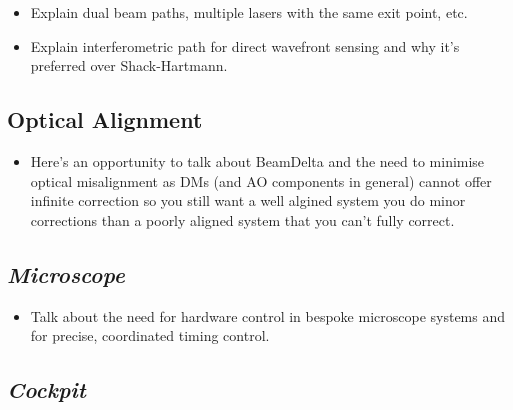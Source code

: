 	\begin{itemize}
		\item Explain dual beam paths, multiple lasers with the same exit point, etc.
		\item Explain interferometric path for direct wavefront sensing and why it's preferred over Shack-Hartmann.
	\end{itemize}

	\subsection{Optical Alignment}
	\label{subsec:alignment}
	
	\begin{itemize}
		\item Here's an opportunity to talk about BeamDelta and the need to minimise optical misalignment as DMs (and  AO components in general) cannot offer infinite correction so you still want a well algined system you do minor corrections than a poorly aligned system that you can't fully correct.
	\end{itemize}

	\subsection{\textit{Microscope}}
	\label{subsec:microscope}
	
	\begin{itemize}
		\item Talk about the need for hardware control in bespoke microscope systems and for precise, coordinated timing control.
	\end{itemize}

	\subsection{\textit{Cockpit}}
	\label{subsec:cockpit}

